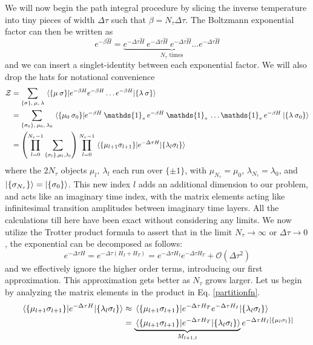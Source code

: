 \documentclass[../thesis_main.tex]{subfiles}
\begin{document}
We will now begin the path integral procedure by slicing the inverse temperature into tiny pieces of width $\Delta \tau$ such that $\beta = N_\tau \Delta \tau$. The Boltzmann exponential factor can then be written as
\begin{equation}
    e^{-\beta \hat{H}} = \underbrace{e^{-\Delta \tau \hat{H}} \: e^{-\Delta \tau \hat{H}} \: e^{-\Delta \tau \hat{H}} \ldots e^{-\Delta \tau \hat{H}}}_{N_\tau \text{ times}}
\end{equation}  
and we can insert a singlet-identity between each exponential factor. We will also drop the hats for notational convenience
\begingroup
\allowdisplaybreaks
\begin{align}
    \mathcal{Z} &= \sum_{\{\sigma\}, \:\mu, \:\lambda} \mel{\{\mu \: \sigma\}}{e^{-\beta {H}} e^{-\beta {H}} \ldots e^{-\beta {H}} }{\{ \lambda \: \sigma\}} \nonumber \\
    &= \sum_{\{\sigma_0\}, \:\mu_0, \:\lambda_0} \mel{\{\mu_0 \: \sigma_0\}}{ e^{-\beta {H}} \:\mathds{1}_s\: e^{-\beta {H}} \:\mathds{1}_s\: \ldots \mathds{1}_s\: e^{-\beta {H}} \: }{\{ \lambda \: \sigma_0\}} \nonumber \\
    &= \qty(\prod_{l=0}^{N_\tau-1} \sum_{\{\sigma_l\}, \mu_l, \lambda_l}) \prod_{l=0}^{N_\tau-1} \mel{\{\mu_{l+1} \sigma_{l+1}\}}{e^{-\Delta \tau H}}{\{\lambda_{l} \sigma_l\}}
    \label{partitionfn}
\end{align}
\endgroup
where the $2N_\tau$ objects $\mu_l, \: \lambda_l$ each run over $\{\pm 1\}$, with $\mu_{N_\tau} = \mu_0$, $\lambda_{N_\tau} = \lambda_0$, and $\ket{\{\sigma_{N_\tau}\}} = \ket{\{\sigma_{0}\}}$. This new index $l$ adds an additional dimension to our problem, and acts like an imaginary time index, with the matrix elements acting like infinitesimal transition amplitudes between imaginary time layers. All the calculations till here have been exact without considering any limits. We now utilize the Trotter product formula to assert that in the limit $N_\tau \to \infty$ or $\Delta \tau \to 0$, the exponential can be decomposed as follows:
\begin{equation}
    e^{-\Delta \tau H} = e^{-\Delta \tau (H_I + H_T)} = e^{-\Delta \tau H_I} e^{-\Delta \tau H_T} + \mathcal{O}(\Delta \tau^2) 
\end{equation}
and we effectively ignore the higher order terms, introducing our first approximation. This approximation gets better as $N_\tau$ grows larger. Let us begin by analyzing the matrix elements in the product in Eq. \eqref{partitionfn}.
\begingroup
\allowdisplaybreaks
\begin{align}
    \mel{\{\mu_{l+1} \sigma_{l+1}\}}{e^{-\Delta \tau H}}{\{\lambda_{l} \sigma_l\}} &\approx \mel{\{\mu_{l+1} \sigma_{l+1}\}}{e^{-\Delta \tau H_T} e^{-\Delta \tau H_I}}{\{\lambda_{l} \sigma_l\}} \nonumber\\
    & = \underbrace{\mel{\{\mu_{l+1} \sigma_{l+1}\}}{e^{-\Delta \tau H_T}}{\{\lambda_l \sigma_l\}}}_{M_{l+1, l}} e^{-\Delta \tau H_I[\{\mu_l \sigma_l\}]}
    \label{Ml+1,l}
\end{align}
\end{document}
